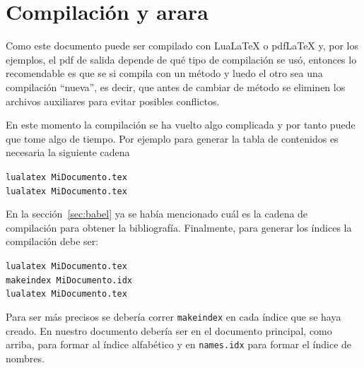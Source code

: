 
\chapter{Compilación y arara}
Como este documento puede ser compilado con Lua\LaTeX{} o pdf\LaTeX{} y, por
los ejemplos, el pdf de salida depende de qué tipo de compilación se usó,
entonces lo recomendable es que se si compila con un método y luedo el otro
sea una compilación ``nueva'', es decir, que antes de cambiar de método se
eliminen los archivos auxiliares para evitar posibles conflictos.

En este momento la compilación se ha vuelto algo complicada y por tanto puede
que tome algo de tiempo. Por ejemplo para generar la tabla de contenidos es
necesaria la siguiente cadena
\begin{flushleft}
  \verb|lualatex MiDocumento.tex|\\
  \verb|lualatex MiDocumento.tex|
\end{flushleft}

En la sección~\ref{sec:babel} ya se había mencionado cuál es la cadena de
compilación para obtener la bibliografía. Finalmente, para generar los
índices la compilación debe ser:
\begin{flushleft}
  \verb|lualatex MiDocumento.tex|\\
  \verb|makeindex MiDocumento.idx|\\
  \verb|lualatex MiDocumento.tex|
\end{flushleft}

Para ser más precisos se debería correr \texttt{makeindex} en cada índice que
se haya creado. En nuestro documento debería ser en el documento principal,
como arriba, para formar al índice alfabético y en \texttt{names.idx} para
formar el índice de nombres.


